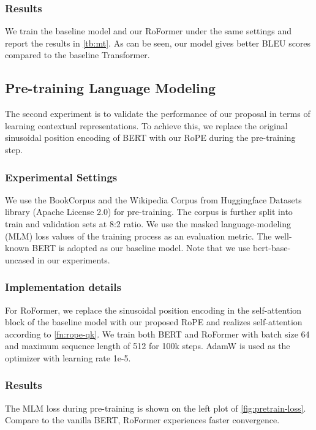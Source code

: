 \subsubsection{Results} 
We train the baseline model and our RoFormer under the same settings and report the results in \ref{tb:mt}. As can be seen, our model gives better BLEU scores compared to the baseline Transformer. 

\subsection{Pre-training Language Modeling}\label{subsec:pretrain}
The second experiment is to validate the performance of our proposal in terms of learning contextual representations. To achieve this, we replace  the original sinusoidal position encoding of BERT with our RoPE during the pre-training step.

\subsubsection{Experimental Settings} We use the BookCorpus \cite{moviebook} and the Wikipedia Corpus \cite{wikidump} from Huggingface Datasets library (Apache License 2.0) for pre-training. The corpus is further split into train and validation sets at 8:2 ratio. We use the masked language-modeling (MLM) loss values of the training process as an evaluation  metric. The well-known BERT \cite{Devlin2019BERTPO} is adopted as our baseline model. Note that we use bert-base-uncased in our experiments.

\subsubsection{Implementation details} For RoFormer, we replace the sinusoidal position encoding in the self-attention block of the baseline model with our proposed RoPE and realizes self-attention according to \ref{fn:rope-qk}. We train both BERT and RoFormer with batch size 64 and maximum sequence length  of 512 for 100k steps. AdamW \cite{adamw} is used as the optimizer with learning rate 1e-5. 

\subsubsection{Results} 
The MLM loss during pre-training is shown on the left plot of \ref{fig:pretrain-loss}. Compare to the vanilla BERT, RoFormer experiences faster convergence. 


